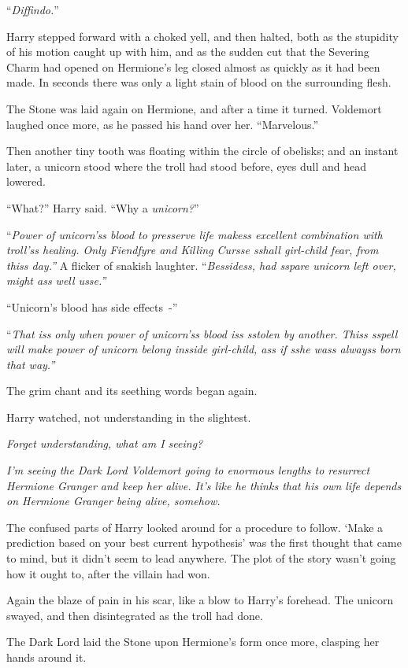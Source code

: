 ``\emph{Diffindo.}''

Harry stepped forward with a choked yell, and then halted, both as the stupidity of his motion caught up with him, and as the sudden cut that the Severing Charm had opened on Hermione's leg closed almost as quickly as it had been made. In seconds there was only a light stain of blood on the surrounding flesh.

The Stone was laid again on Hermione, and after a time it turned. Voldemort laughed once more, as he passed his hand over her. ``Marvelous.''

Then another tiny tooth was floating within the circle of obelisks; and an instant later, a unicorn stood where the troll had stood before, eyes dull and head lowered.

``What?'' Harry said. ``Why a \emph{unicorn?}''

``\emph{Power of unicorn'ss blood to presserve life makess excellent combination with troll'ss healing. Only Fiendfyre and Killing Cursse sshall girl-child fear, from thiss day.''} A flicker of snakish laughter. ``\emph{Bessidess, had sspare unicorn left over, might ass well usse.''}

``Unicorn's blood has side effects~-''

``\emph{That iss only when power of unicorn'ss blood iss sstolen by another. Thiss sspell will make power of unicorn belong insside girl-child, ass if sshe wass alwayss born that way.''}

The grim chant and its seething words began again.

Harry watched, not understanding in the slightest.

\emph{Forget understanding, what am I seeing?}

\emph{I'm seeing the Dark Lord Voldemort going to enormous lengths to resurrect Hermione Granger and keep her alive. It's like he thinks that his own life depends on Hermione Granger being alive, somehow.}

The confused parts of Harry looked around for a procedure to follow. `Make a prediction based on your best current hypothesis' was the first thought that came to mind, but it didn't seem to lead anywhere. The plot of the story wasn't going how it ought to, after the villain had won.

Again the blaze of pain in his scar, like a blow to Harry's forehead. The unicorn swayed, and then disintegrated as the troll had done.

The Dark Lord laid the Stone upon Hermione's form once more, clasping her hands around it.

